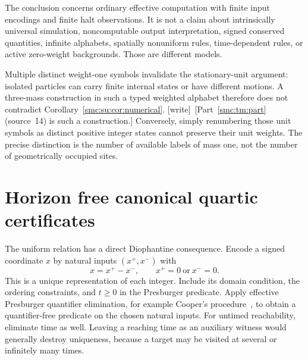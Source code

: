 \documentclass[11pt,letterpaper]{article}
\numberwithin{equation}{section}
\theoremstyle{definition}
\theoremstyle{remark}
\newcommand{\wtag}{\textup{[write]}}
\begin{document}
The conclusion concerns ordinary effective computation with finite input
encodings and finite halt observations. It is not a claim about intrinsically
universal simulation, noncomputable output interpretation, signed conserved
quantities, infinite alphabets, spatially nonuniform rules, time-dependent
rules, or active zero-weight backgrounds. Those are different models.

Multiple distinct weight-one symbols invalidate the stationary-unit argument:
isolated particles can carry finite internal states or have different motions.
A three-mass construction in such a typed weighted alphabet therefore does not
contradict Corollary~\ref{smc:su:cor:numerical}. \wtag\ [Part~\ref{smc:tm:part} (source~14) is such a construction.] Conversely, simply renumbering those
unit symbols as distinct positive integer states cannot preserve their unit
weights. The precise distinction is the number of available labels of mass one,
not the number of geometrically occupied sites.

\section{Horizon free canonical quartic certificates}\label{smc:su:sec:quartic}

The uniform relation has a direct Diophantine consequence. Encode a signed
coordinate $x$ by natural inputs $(x^+,x^-)$ with
\[
 x=x^+-x^-,\qquad x^+=0\ \text{or}\ x^-=0.
\]
This is a unique representation of each integer. Include its domain condition,
the ordering constraints, and $t\ge0$ in the Presburger predicate. Apply effective
Presburger quantifier elimination, for example Cooper's procedure~\cite{cooper},
to obtain a quantifier-free predicate on the chosen natural inputs.
For untimed reachability, eliminate time as well. Leaving a reaching time as an
auxiliary witness would generally destroy uniqueness, because a target may be
visited at several or infinitely many times.
\end{document}
